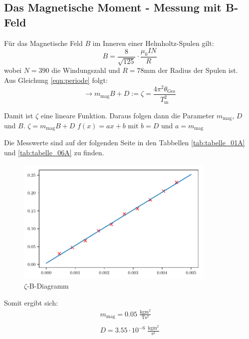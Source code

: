 \subsection{Das Magnetische Moment - Messung mit B-Feld}

Für das Magnetische Feld $B$ im Inneren einer Helmholtz-Spulen gilt:
\begin{equation}
    B= \frac{8}{\sqrt{125}} \cdot \frac{\mu_0 I N}{R}
\end{equation}
wobei $N=390$ die Windungszahl und $R=78$mm der Radius der Spulen ist.\\
Aus Gleichung \ref{eqn:periode}
folgt:
\begin{equation}
    \to m_\text{mag}B+D := \zeta = \frac{4\pi^2\theta_\text{Ges}}{T^2_\text{m}}
\end{equation}

Damit ist $\zeta$ eine lineare Funktion. Daraus folgen dann die Parameter $m_\text{mag}$, $D$ und $B$.\newline
$\zeta = m_\text{mag}B + D$ \to $f(x)=ax+b$ mit $b = D$ und $a=m_\text{mag}$

Die Messwerte sind auf der folgenden Seite in den Tabbellen \ref{tab:tabelle_01A} und \ref{tab:tabelle_06A}
zu finden.
\begin{figure}[h]
    \centering
    \includegraphics[width=0.85\textwidth, height=0.5\textwidth]{build/plot.pdf}
    \caption{$\zeta$-B-Diagramm}        
    \label{fig:Diagramm}
\end{figure}

Somit ergibt sich:
\begin{gather*}
    m_\text{mag} = 0.05 \;\mathrm{\frac{kgm^2}{Ts^2}}\\\\
    D = 3.55\cdot10^{-6} \;\mathrm{\frac{kgm^2}{s^2}}
\end{gather*}


